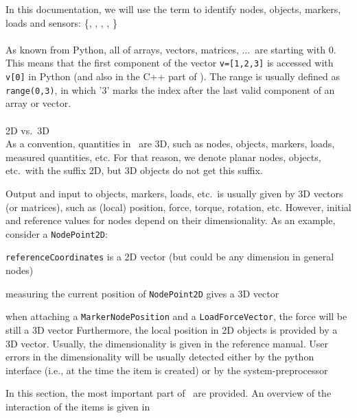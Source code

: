 In this documentation, we will use the term  to identify nodes, objects, markers, loads and sensors:
\be
   \in \{, , , ,  \}
\ee
\vspace{12pt}\\
 \vspace{6pt}\\
As known from Python, all  of arrays, vectors, matrices, ...\ are starting with 0. This means that the first component of the vector \texttt{v=[1,2,3]} is accessed with \texttt{v[0]} in Python (and also in the C++ part of \codeName ). The range is usually defined as \texttt{range(0,3)}, in which '3' marks the index after the last valid component of an array or vector.
%
\vspace{12pt}\\
 \vspace{6pt}\\ 
\ac{2D} vs.\ \ac{3D}\vspace{6pt}\\ 
As a convention, quantities in \codeName\ are 3D, such as nodes, objects, markers, loads, measured quantities, etc. 
For that reason, we denote planar nodes, objects, etc.\ with the suffix 2D, but 3D objects do not get this suffix.

Output and input to objects, markers, loads, etc.\ is usually given by 3D vectors (or matrices), such as (local) position, force, torque, rotation, etc. However, initial and reference values for nodes depend on their dimensionality.
As an example, consider a \texttt{NodePoint2D}:
\bi
  \item \texttt{referenceCoordinates} is a 2D vector (but could be any dimension in general nodes)
  \item measuring the current position of \texttt{NodePoint2D} gives a 3D vector
  \item when attaching a \texttt{MarkerNodePosition} and a \texttt{LoadForceVector}, the force will be still a 3D vector
\ei
Furthermore, the local position in 2D objects is provided by a 3D vector. Usually, the dimensionality is given in the reference manual. User errors in the dimensionality will be usually detected either by the python interface (i.e., at the time the item is created) or by the system-preprocessor

 \label{sec:items}
%
In this section, the most important part of \codeName\ are provided. An overview of the interaction of the items is given in 

